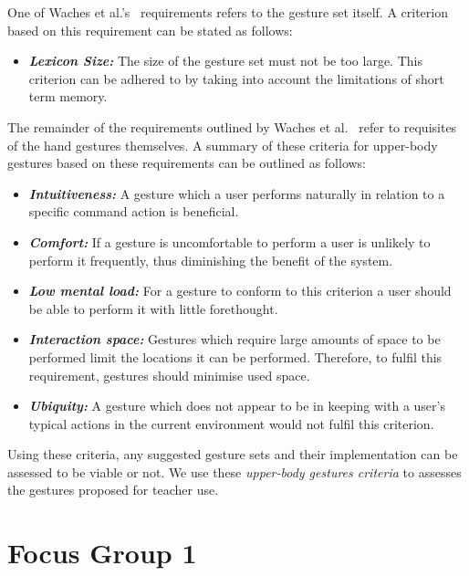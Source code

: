 \documentclass[manuscript, review, screen]{acmart}
\begin{document}
One of Waches et al.'s~\citeyearpar{Wachs2011} requirements refers to the gesture set itself.
A criterion based on this requirement can be stated as follows:

\begin{itemize}
\item \textit{\textbf{Lexicon Size:}}  The size of the gesture set must not be too large.
This criterion can be adhered to by taking into account the limitations of short term memory.\\ 
\end{itemize}

The remainder of the requirements outlined by Waches et al.~\citeyearpar{Wachs2011} refer to requisites of the hand gestures themselves.
A summary of these criteria for upper-body gestures based on these requirements can be outlined as follows:

\begin{itemize}
\item \textit{\textbf{Intuitiveness:}} A gesture which a user performs naturally in relation to a specific command action is beneficial.
\item \textit{\textbf{Comfort:}} If a gesture is uncomfortable to perform a user is unlikely to perform it frequently, thus diminishing the benefit of the system.
\item \textit{\textbf{Low mental load:}} For a gesture to conform to this criterion a user should be able to perform it with little forethought.
\item \textit{\textbf{Interaction space:}} Gestures which require large amounts of space to be performed limit the locations it can be performed.
Therefore, to fulfil this requirement, gestures should minimise used space.
\item \textit{\textbf{Ubiquity:}} A gesture which does not appear to be in keeping with a user's typical actions in the current environment would not fulfil this criterion. \\ 
\end{itemize}

Using these criteria, any suggested gesture sets and their implementation can be assessed to be viable or not.
We use these \textit{upper-body gestures criteria} to assesses the gestures proposed for teacher use.


\section{Focus Group 1}  
\label{sec:focusgroup1}
\end{document}
